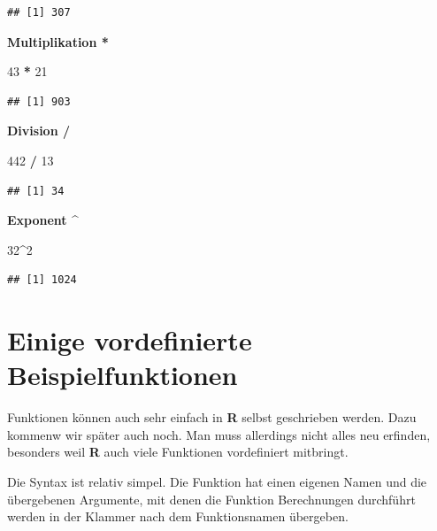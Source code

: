 \documentclass[]{book}
\newenvironment{Shaded}{\begin{snugshade}}{\end{snugshade}}
\newcommand{\DecValTok}[1]{\textcolor[rgb]{0.00,0.00,0.81}{#1}}
\newcommand{\StringTok}[1]{\textcolor[rgb]{0.31,0.60,0.02}{#1}}
\newcommand{\OperatorTok}[1]{\textcolor[rgb]{0.81,0.36,0.00}{\textbf{#1}}}
\begin{document}
\begin{verbatim}
## [1] 307
\end{verbatim}

\textbf{Multiplikation * }

\begin{Shaded}
\begin{Highlighting}[]
\DecValTok{43} \OperatorTok{*}\StringTok{ }\DecValTok{21}
\end{Highlighting}
\end{Shaded}

\begin{verbatim}
## [1] 903
\end{verbatim}

\textbf{Division / }

\begin{Shaded}
\begin{Highlighting}[]
\DecValTok{442} \OperatorTok{/}\StringTok{ }\DecValTok{13}
\end{Highlighting}
\end{Shaded}

\begin{verbatim}
## [1] 34
\end{verbatim}

\textbf{Exponent \^{} }

\begin{Shaded}
\begin{Highlighting}[]
\DecValTok{32}\OperatorTok{^}\DecValTok{2}
\end{Highlighting}
\end{Shaded}

\begin{verbatim}
## [1] 1024
\end{verbatim}

\section{Einige vordefinierte
Beispielfunktionen}\label{einige-vordefinierte-beispielfunktionen}

Funktionen können auch sehr einfach in \textbf{R} selbst geschrieben
werden. Dazu kommenw wir später auch noch. Man muss allerdings nicht
alles neu erfinden, besonders weil \textbf{R} auch viele Funktionen
vordefiniert mitbringt.

Die Syntax ist relativ simpel. Die Funktion hat einen eigenen Namen und
die übergebenen Argumente, mit denen die Funktion Berechnungen
durchführt werden in der Klammer nach dem Funktionsnamen übergeben.
\end{document}
